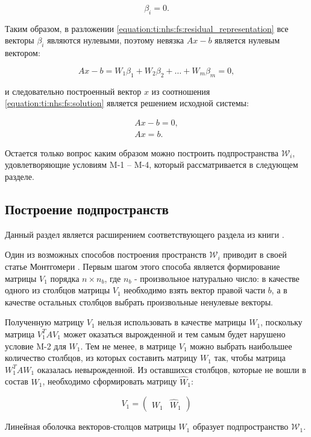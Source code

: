 $$
	\beta_i = 0.
$$

Таким образом, в разложении \ref{equation:ti:nhs:fs:residual_representation} все векторы $\beta_i$ являются нулевыми, поэтому невязка
$Ax - b$ является нулевым вектором:

$$
	Ax - b = W_1 \beta_1 + W_2 \beta_2 + \dots + W_m \beta_m = 0,
$$

и следовательно построенный вектор $x$ из соотношения \ref{equation:ti:nhs:fs:solution} является решением исходной системы:

$$
	\begin{array}{c}
		Ax - b = 0, \\
		Ax = b.
	\end{array}
$$

Остается только вопрос каким образом можно построить подпространства $\mathcal W_i$, удовлетворяющие условиям M-1 -- M-4, который 
рассматривается в следующем разделе.

\subsection{Построение подпространств} \label{subsection:ti:nhs:finding_subspaces}

Данный раздел является расширением соответствующего раздела из книги \cite[с.~44--50]{Zamarashkin}.

Один из возможных способов построения пространств $\mathcal W_i$ приводит в своей статье Монтгомери \cite{Montgomery}. Первым шагом
этого способа является формирование матрицы $V_1$ порядка $n \times n_b$, где $n_b$ - произвольное натурально число: в качестве одного
из столбцов матрицы $V_1$ необходимо взять вектор правой части $b$, а в качестве остальных столбцов выбрать произвольные ненулевые векторы.

Полученную матрицу $V_1$ нельзя использовать в качестве матрицы $W_1$, поскольку матрица $V_1^T A V_1$ может оказаться вырожденной и тем самым
будет нарушено условие M-2 для $W_1$. Тем не менее, в матрице $V_1$ можно выбрать наибольшее количество столбцов, из которых составить
матрицу $W_1$ так, чтобы матрица $W_1^T A W_1$ оказалась невырожденной. Из оставшихся столбцов, которые не вошли в состав $W_1$, необходимо
сформировать матрицу $\widehat{W}_1$:

$$
	V_1 =
		\begin{pmatrix}
			W_1 & \widehat{W}_1
		\end{pmatrix}
$$

Линейная оболочка векторов-столцов матрицы $W_1$ образует подпространство $\mathcal W_1$.

